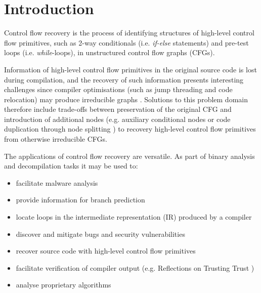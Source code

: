 
\section{Introduction}

Control flow recovery is the process of identifying structures of high-level control flow primitives, such as 2-way conditionals (i.e. \textit{if-else} statements) and pre-test loops (i.e. \textit{while}-loops), in unstructured control flow graphs (CFGs).

Information of high-level control flow primitives in the original source code is lost during compilation, and the recovery of such information presents interesting challenges since compiler optimisations (such as jump threading and code relocation) may produce irreducible graphs \cite{cifuentes_reverse_comp}. Solutions to this problem domain therefore include trade-offs between preservation of the original CFG and introduction of additional nodes (e.g. auxiliary conditional nodes \cite{no_more_gotos} or code duplication through node splitting \cite{node_splitting}) to recovery high-level control flow primitives from otherwise irreducible CFGs.

The applications of control flow recovery are versatile. As part of binary analysis and decompilation tasks it may be used to:

\begin{itemize}
	\item facilitate malware analysis
	\item provide information for branch prediction
	\item locate loops in the intermediate representation (IR) produced by a compiler
	\item discover and mitigate bugs and security vulnerabilities
	\item recover source code with high-level control flow primitives
	\item facilitate verification of compiler output (e.g. Reflections on Trusting Trust \cite{trusting_trust})
	\item analyse proprietary algorithms
\end{itemize}



\clearpage %


